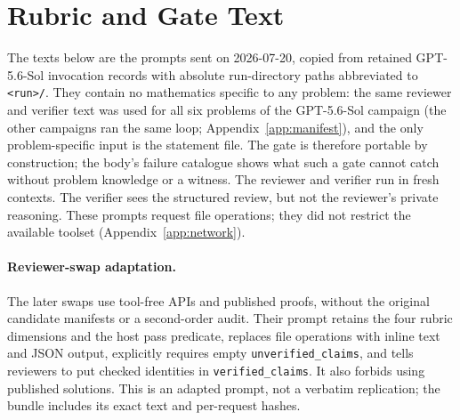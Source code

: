 \section{Rubric and Gate Text}
\label{app:rubric}

The texts below are the prompts sent on 2026-07-20, copied from retained GPT-5.6-Sol invocation records with absolute run-directory paths abbreviated to \texttt{<run>/\allowbreak }. They contain no mathematics specific to any problem: the same reviewer and verifier text was used for all six problems of the GPT-5.6-Sol campaign (the other campaigns ran the same loop; Appendix~\ref{app:manifest}), and the only problem-specific input is the statement file. The gate is therefore portable by construction; the body's failure catalogue shows what such a gate cannot catch without problem knowledge or a witness. The reviewer and verifier run in fresh contexts. The verifier sees the structured review, but not the reviewer's private reasoning. These prompts request file operations; they did not restrict the available toolset (Appendix~\ref{app:network}).

\paragraph{Reviewer-swap adaptation.} The later swaps use tool-free APIs and published proofs, without the original candidate manifests or a second-order audit. Their prompt retains the four rubric dimensions and the host pass predicate, replaces file operations with inline text and JSON output, explicitly requires empty \texttt{unverified\_claims}, and tells reviewers to put checked identities in \texttt{verified\_claims}. It also forbids using published solutions. This is an adapted prompt, not a verbatim replication; the bundle includes its exact text and per-request hashes.

